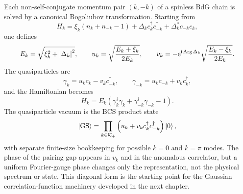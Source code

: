 Each non-self-conjugate momentum pair $(k,-k)$ of a spinless BdG chain is solved
by a canonical Bogoliubov transformation.  Starting from
\begin{equation}
    H_k
    =
    \xi_k\left(n_k+n_{-k}-1\right)
    +\Delta_k c_k^\dagger c_{-k}^\dagger
    +\Delta_k^*c_{-k}c_k,
\end{equation}
one defines
\begin{equation}
    E_k=\sqrt{\xi_k^2+\left|\Delta_k\right|^2},
    \qquad
    u_k=\sqrt{\frac{E_k+\xi_k}{2E_k}},
    \qquad
    v_k=-\mathrm{e}^{\mathrm{i}\operatorname{Arg}\Delta_k}
    \sqrt{\frac{E_k-\xi_k}{2E_k}}.
\end{equation}
The quasiparticles are
\begin{equation}
    \gamma_k=u_kc_k-v_kc_{-k}^\dagger,
    \qquad
    \gamma_{-k}=u_kc_{-k}+v_kc_k^\dagger,
\end{equation}
and the Hamiltonian becomes
\begin{equation}
    H_k=E_k\left(\gamma_k^\dagger\gamma_k+
    \gamma_{-k}^\dagger\gamma_{-k}-1\right).
\end{equation}
The quasiparticle vacuum is the BCS product state
\begin{equation}
    \left|\mathrm{GS}\right\rangle
    =
    \prod_{k\in\mathcal{K}_+}
    \left(u_k+v_kc_k^\dagger c_{-k}^\dagger\right)\left|0\right\rangle,
\end{equation}
with separate finite-size bookkeeping for possible $k=0$ and $k=\pi$ modes.
The phase of the pairing gap appears in $v_k$ and in the anomalous correlator,
but a uniform Fourier-gauge phase changes only the representation, not the
physical spectrum or state.  This diagonal form is the starting point for the
Gaussian correlation-function machinery developed in the next chapter.
